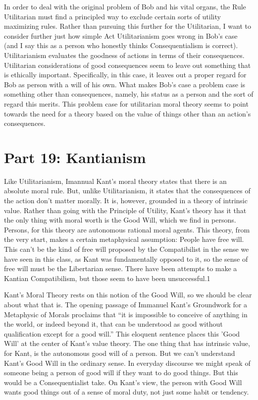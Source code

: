 In order to deal with the original problem of Bob and his vital organs, the Rule Utilitarian must find a principled way to exclude certain sorts of utility maximizing rules. Rather than pursuing this further for the Utilitarian, I want to consider further just how simple Act Utilitarianism goes wrong in Bob’s case (and I say this as a person who honestly thinks Consequentialism is correct). Utilitarianism evaluates the goodness of actions in terms of their consequences. Utilitarian considerations of good consequences seem to leave out something that is ethically important. Specifically, in this case, it leaves out a proper regard for Bob as person with a will of his own. What makes Bob’s case a problem case is something other than consequences, namely, his status as a person and the sort of regard this merits. This problem case for utilitarian moral theory seems to point towards the need for a theory based on the value of things other than an action’s consequences.

\chapter{Part 19: Kantianism}

Like Utilitarianism, Imannual Kant’s moral theory states that there is an absolute moral rule. But, unlike Utilitarianism, it states that the consequences of the action don't matter morally. It is, however, grounded in a theory of intrinsic value. Rather than going with the Principle of Utility, Kant's theory has it that the only thing with moral worth is the Good Will, which we find in persons. Persons, for this theory are  autonomous rational moral agents. This theory, from the very start, makes a certain metaphysical assumption: People have free will. This can't be the kind of free will proposed by the Compatibilist in the sense we have seen in this class, as Kant was fundamentally opposed to it, so the sense of free will must be the Libertarian sense. There have been attempts to make a Kantian Compatibilism, but those seem to have been unsuccessful.1

Kant's Moral Theory rests on this notion of the Good Will, so we should be clear about what that is. The opening passage of Immanuel Kant’s Groundwork for a Metaphysic of Morals proclaims that “it is impossible to conceive of anything in the world, or indeed beyond it, that can be understood as good without qualification except for a good will.” This eloquent sentence places this 'Good Will' at the center of Kant's value theory. The one thing that has intrinsic value, for Kant, is the autonomous good will of a person. But we can't understand Kant's Good Will in the ordinary sense. In everyday discourse we might speak of someone being a person of good will if they want to do good things. But this would be a Consequentialist take. On Kant’s view, the person with Good Will wants  good things out of a sense of moral duty, not just some habit or tendency.

